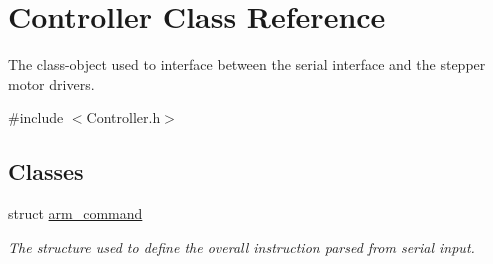 \hypertarget{class_controller}{}\section{Controller Class Reference}
\label{class_controller}


The class-\/object used to interface between the serial interface and the stepper motor drivers.  




{\ttfamily \#include $<$Controller.\+h$>$}

\subsection*{Classes}
\begin{DoxyCompactItemize}
\item 
struct \hyperlink{struct_controller_1_1arm__command}{arm\+\_\+command}
\begin{DoxyCompactList}\small\item\em The structure used to define the overall instruction parsed from serial input. \end{DoxyCompactList}\end{DoxyCompactItemize}
